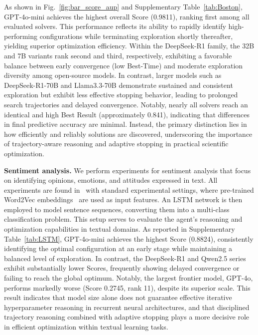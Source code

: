 As shown in Fig.~\ref{fig:bar_score_aup} and Supplementary Table~\ref{tab:Boston}, GPT-4o-mini achieves the highest overall Score (0.9811), ranking first among all evaluated solvers. This performance reflects its ability to rapidly identify high-performing configurations while terminating exploration shortly thereafter, yielding superior optimization efficiency. Within the DeepSeek-R1 family, the 32B and 7B variants rank second and third, respectively, exhibiting a favorable balance between early convergence (low Best-Time) and moderate exploration diversity among open-source models. In contrast, larger models such as DeepSeek-R1-70B and Llama3.3-70B demonstrate sustained and consistent exploration but exhibit less effective stopping behavior, leading to prolonged search trajectories and delayed convergence. Notably, nearly all solvers reach an identical and high Best Result (approximately 0.841), indicating that differences in final predictive accuracy are minimal. Instead, the primary distinction lies in how efficiently and reliably solutions are discovered, underscoring the importance of trajectory-aware reasoning and adaptive stopping in practical scientific optimization.


{\noindent\bf Sentiment analysis.} We perform experiments for sentiment analysis that focus on identifying opinions, emotions, and attitudes expressed in text. All experiments are found in~\cite{sentiment_analysis} with standard experimental settings, where pre-trained Word2Vec embeddings~\cite{word2vec} are used as input features. An LSTM network is then employed to model sentence sequences, converting them into a multi-class classification problem. This setup serves to evaluate the agent's reasoning and optimization capabilities in textual domains.
As reported in Supplementary Table~\ref{tab:LSTM}, GPT-4o-mini achieves the highest Score (0.8824), consistently identifying the optimal configuration at an early stage while maintaining a balanced level of exploration. In contrast, the DeepSeek-R1 and Qwen2.5 series exhibit substantially lower Scores, frequently showing delayed convergence or failing to reach the global optimum. Notably, the largest frontier model, GPT-4o, performs markedly worse (Score 0.2745, rank 11), despite its superior scale. This result indicates that model size alone does not guarantee effective iterative hyperparameter reasoning in recurrent neural architectures, and that disciplined trajectory reasoning combined with adaptive stopping plays a more decisive role in efficient optimization within textual learning tasks.

